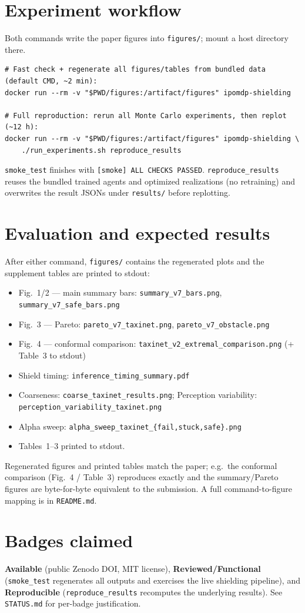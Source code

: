 \documentclass[10pt]{article}
\newcommand{\code}[1]{\texttt{#1}}
\begin{document}
\section*{Experiment workflow}
Both commands write the paper figures into \code{figures/}; mount a host directory there.
\begin{verbatim}
# Fast check + regenerate all figures/tables from bundled data (default CMD, ~2 min):
docker run --rm -v "$PWD/figures:/artifact/figures" ipomdp-shielding

# Full reproduction: rerun all Monte Carlo experiments, then replot (~12 h):
docker run --rm -v "$PWD/figures:/artifact/figures" ipomdp-shielding \
    ./run_experiments.sh reproduce_results
\end{verbatim}
\code{smoke\_test} finishes with \code{[smoke] ALL CHECKS PASSED}. \code{reproduce\_results}
reuses the bundled trained agents and optimized realizations (no retraining) and
overwrites the result JSONs under \code{results/} before replotting.

\section*{Evaluation and expected results}
After either command, \code{figures/} contains the regenerated plots and the
supplement tables are printed to stdout:
\begin{itemize}
  \item Fig.~1/2 --- main summary bars: \code{summary\_v7\_bars.png}, \code{summary\_v7\_safe\_bars.png}
  \item Fig.~3 --- Pareto: \code{pareto\_v7\_taxinet.png}, \code{pareto\_v7\_obstacle.png}
  \item Fig.~4 --- conformal comparison: \code{taxinet\_v2\_extremal\_comparison.png} (+ Table~3 to stdout)
  \item Shield timing: \code{inference\_timing\_summary.pdf}
  \item Coarseness: \code{coarse\_taxinet\_results.png}; Perception variability: \code{perception\_variability\_taxinet.png}
  \item Alpha sweep: \code{alpha\_sweep\_taxinet\_\{fail,stuck,safe\}.png}
  \item Tables~1--3 printed to stdout.
\end{itemize}
Regenerated figures and printed tables match the paper; e.g.\ the conformal
comparison (Fig.~4 / Table~3) reproduces exactly and the summary/Pareto figures
are byte-for-byte equivalent to the submission. A full command-to-figure mapping
is in \code{README.md}.

\section*{Badges claimed}
\textbf{Available} (public Zenodo DOI, MIT license), \textbf{Reviewed/Functional}
(\code{smoke\_test} regenerates all outputs and exercises the live shielding
pipeline), and \textbf{Reproducible} (\code{reproduce\_results} recomputes the
underlying results). See \code{STATUS.md} for per-badge justification.
\end{document}
